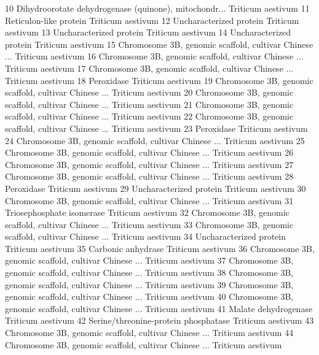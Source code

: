 \documentclass{beamer}
\begin{document}
\begin{frame}[fragile]
\begin{itemize}
\begin{Schunk}
\begin{Soutput}
10 Dihydroorotate dehydrogenase (quinone), mitochondr... Triticum aestivum
11                                Reticulon-like protein Triticum aestivum
12                               Uncharacterized protein Triticum aestivum
13                               Uncharacterized protein Triticum aestivum
14                               Uncharacterized protein Triticum aestivum
15 Chromosome 3B, genomic scaffold, cultivar Chinese ... Triticum aestivum
16 Chromosome 3B, genomic scaffold, cultivar Chinese ... Triticum aestivum
17 Chromosome 3B, genomic scaffold, cultivar Chinese ... Triticum aestivum
18                                            Peroxidase Triticum aestivum
19 Chromosome 3B, genomic scaffold, cultivar Chinese ... Triticum aestivum
20 Chromosome 3B, genomic scaffold, cultivar Chinese ... Triticum aestivum
21 Chromosome 3B, genomic scaffold, cultivar Chinese ... Triticum aestivum
22 Chromosome 3B, genomic scaffold, cultivar Chinese ... Triticum aestivum
23                                            Peroxidase Triticum aestivum
24 Chromosome 3B, genomic scaffold, cultivar Chinese ... Triticum aestivum
25 Chromosome 3B, genomic scaffold, cultivar Chinese ... Triticum aestivum
26 Chromosome 3B, genomic scaffold, cultivar Chinese ... Triticum aestivum
27 Chromosome 3B, genomic scaffold, cultivar Chinese ... Triticum aestivum
28                                            Peroxidase Triticum aestivum
29                               Uncharacterized protein Triticum aestivum
30 Chromosome 3B, genomic scaffold, cultivar Chinese ... Triticum aestivum
31                             Triosephosphate isomerase Triticum aestivum
32 Chromosome 3B, genomic scaffold, cultivar Chinese ... Triticum aestivum
33 Chromosome 3B, genomic scaffold, cultivar Chinese ... Triticum aestivum
34                               Uncharacterized protein Triticum aestivum
35                                    Carbonic anhydrase Triticum aestivum
36 Chromosome 3B, genomic scaffold, cultivar Chinese ... Triticum aestivum
37 Chromosome 3B, genomic scaffold, cultivar Chinese ... Triticum aestivum
38 Chromosome 3B, genomic scaffold, cultivar Chinese ... Triticum aestivum
39 Chromosome 3B, genomic scaffold, cultivar Chinese ... Triticum aestivum
40 Chromosome 3B, genomic scaffold, cultivar Chinese ... Triticum aestivum
41                                  Malate dehydrogenase Triticum aestivum
42                  Serine/threonine-protein phosphatase Triticum aestivum
43 Chromosome 3B, genomic scaffold, cultivar Chinese ... Triticum aestivum
44 Chromosome 3B, genomic scaffold, cultivar Chinese ... Triticum aestivum

\end{Soutput}
\end{Schunk}
\end{itemize}
\end{frame}
\end{document}

